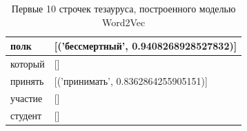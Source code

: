 \documentclass[coursework]{SCWorks}
\begin{document}
\begin{table}[!h]
\begin{tabular}{|l|l|}
        полк                                & {[}('бессмертный', 0.9408268928527832){]}                                                                                                                                                                                                                                                                                                                  \\ \hline
        который                             & {[}{]}                                                                                                                                                                                                                                                                                                                                                     \\ \hline
        принять                             & {[}('принимать', 0.8362864255905151){]}                                                                                                                                                                                                                                                                                                                    \\ \hline
        участие                             & {[}{]}                                                                                                                                                                                                                                                                                                                                                     \\ \hline
        студент                             & {[}{]}                                                                                                                                                                                                                                                                                                                                                     \\ \hline
    \end{tabular}
    \caption{Первые 10 строчек тезауруса, построенного моделью Word2Vec}
    \label{table:word2vec-example}
\end{table}
\end{document}
